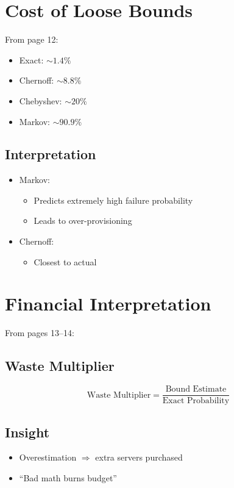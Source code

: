 \documentclass[11pt]{article}
\begin{document}
\section{Cost of Loose Bounds}

From page 12:

\begin{itemize}
\item Exact: $\sim 1.4\%$
\item Chernoff: $\sim 8.8\%$
\item Chebyshev: $\sim 20\%$
\item Markov: $\sim 90.9\%$
\end{itemize}

\subsection{Interpretation}

\begin{itemize}
\item Markov:
\begin{itemize}
\item Predicts extremely high failure probability
\item Leads to over-provisioning
\end{itemize}

\item Chernoff:
\begin{itemize}
\item Closest to actual
\end{itemize}
\end{itemize}

\section{Financial Interpretation}

From pages 13--14:

\subsection{Waste Multiplier}

\[
\text{Waste Multiplier} = \frac{\text{Bound Estimate}}{\text{Exact Probability}}
\]

\subsection{Insight}

\begin{itemize}
\item Overestimation $\Rightarrow$ extra servers purchased
\item ``Bad math burns budget''
\end{itemize}
\end{document}
